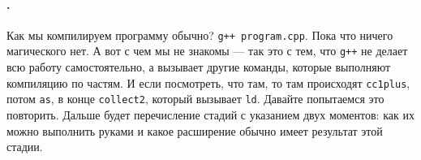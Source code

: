 \documentclass{article}
\begin{document}
    \paragraph{.}
    Как мы компилируем программу обычно? \texttt{g++ program.cpp}. Пока что ничего магического нет. А вот с чем мы не знакомы --- так это с тем, что \texttt{g++} не делает всю работу самостоятельно, а вызывает другие команды, которые выполняют компиляцию по частям. И если посмотреть, что там, то там происходят \texttt{cc1plus}, потом \texttt{as}, в конце \texttt{collect2}, который вызывает \texttt{ld}. Давайте попытаемся это повторить. Дальше будет перечисление стадий с указанием двух моментов: как их можно выполнить руками и какое расширение обычно имеет результат этой стадии.
\end{document}
